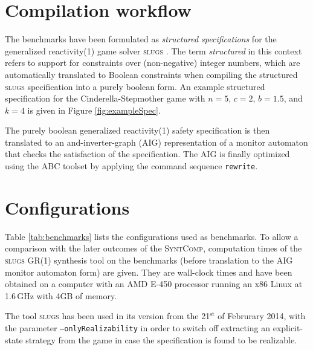 \documentclass[a4paper,conference,10pt]{IEEEtran}
\newcommand{\SyntComp}{\textsc{SyntComp}}
\begin{document}
\section{Compilation workflow}

\noindent The benchmarks have been formulated as \emph{structured specifications} for the generalized reactivity(1) game solver \textsc{slugs} \cite{SlugsReference}. The term \emph{structured} in this context refers to support for constraints over (non-negative) integer numbers, which are automatically translated to Boolean constraints when compiling the structured \textsc{slugs} specification into a purely boolean form. An example structured specification for the Cinderella-Stepmother game with 
$n = 5$, $c = 2$, $b = 1.5$, and $k = 4$ 
is given in Figure \ref{fig:exampleSpec}.

The purely boolean generalized reactivity(1) safety specification is then translated to an and-inverter-graph (AIG) representation of a monitor automaton that checks the satisfaction of the specification. The AIG is finally optimized using the ABC toolset \cite{ABCTool} by applying the command sequence \texttt{rewrite}.

\section{Configurations}

\noindent Table \ref{tab:benchmarks} lists the configurations used as benchmarks.
%
To allow a comparison with the later outcomes of the \SyntComp, computation times of the \textsc{slugs} GR(1) synthesis tool on the benchmarks (before translation to the AIG monitor automaton form) are given. They are wall-clock times and have been obtained on a computer with an AMD E-450 processor running an x86 Linux at 1.6\,GHz with 4GB of memory.

The tool \textsc{slugs} has been used in its version from the 21$^\mathrm{st}$ of Februrary 2014, with the parameter \texttt{--onlyRealizability} in order to switch off extracting an explicit-state strategy from the game in case the specification is found to be realizable.
\end{document}
